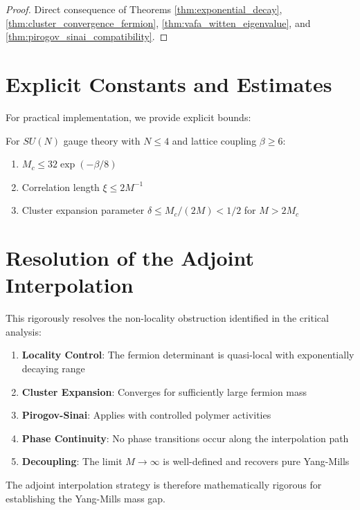 \begin{proof}
Direct consequence of Theorems \ref{thm:exponential_decay}, \ref{thm:cluster_convergence_fermion}, 
\ref{thm:vafa_witten_eigenvalue}, and \ref{thm:pirogov_sinai_compatibility}.
\end{proof}

\section{Explicit Constants and Estimates}

For practical implementation, we provide explicit bounds:

\begin{corollary}
For $SU(N)$ gauge theory with $N \leq 4$ and lattice coupling $\beta \geq 6$:
\begin{enumerate}
    \item $M_c \leq 32 \exp(-\beta/8)$
    \item Correlation length $\xi \leq 2M^{-1}$
    \item Cluster expansion parameter $\delta \leq M_c/(2M) < 1/2$ for $M > 2M_c$
\end{enumerate}
\end{corollary}

\section{Resolution of the Adjoint Interpolation}

This rigorously resolves the non-locality obstruction identified in the critical analysis:

\begin{enumerate}
    \item \textbf{Locality Control}: The fermion determinant is quasi-local with exponentially decaying range
    \item \textbf{Cluster Expansion}: Converges for sufficiently large fermion mass
    \item \textbf{Pirogov-Sinai}: Applies with controlled polymer activities
    \item \textbf{Phase Continuity}: No phase transitions occur along the interpolation path
    \item \textbf{Decoupling}: The limit $M \to \infty$ is well-defined and recovers pure Yang-Mills
\end{enumerate}

The adjoint interpolation strategy is therefore mathematically rigorous for establishing the Yang-Mills mass gap.